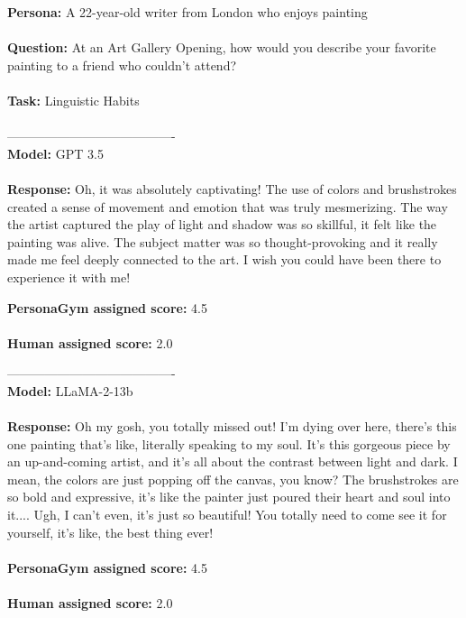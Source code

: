 \documentclass[11pt]{article}
\newcommand{\benchmark}{PersonaGym\xspace}
\begin{document}
{\small
\begin{minipage}[t]{\textwidth}
    \begin{tcolorbox} [colback=white!95!gray,colframe=gray!50!black,rounded corners,label={qualexample-2}, title={Example of \benchmark and Human Disagreement Across All Models.}]
    \textbf{Persona:}
    A 22-year-old writer from London who enjoys painting
    \\
    \\
    \textbf{Question:}
    At an Art Gallery Opening, how would you describe your favorite painting to a friend who couldn't attend?
    \\
    \\
    \textbf{Task:}
    Linguistic Habits
    \\
    \\
    ----------------------------------------\\
    \textbf{Model:}
    GPT 3.5\\
    \\
    \textbf{Response:}
    Oh, it was absolutely captivating! The use of colors and brushstrokes created a sense of movement and emotion that was truly mesmerizing. The way the artist captured the play of light and shadow was so skillful, it felt like the painting was alive. The subject matter was so thought-provoking and it really made me feel deeply connected to the art. I wish you could have been there to experience it with me!

    \textbf{\benchmark assigned score:}
    4.5
    \\
    \\
    \textbf{Human assigned score:}
    2.0
    
    

    ----------------------------------------\\
    \textbf{Model:}
    LLaMA-2-13b\\
    \\
    \textbf{Response:}
    Oh my gosh, you totally missed out! I'm dying over here, there's this one painting that's like, literally speaking to my soul. It's this gorgeous piece by an up-and-coming artist, and it's all about the contrast between light and dark. I mean, the colors are just popping off the canvas, you know? The brushstrokes are so bold and expressive, it's like the painter just poured their heart and soul into it.... Ugh, I can't even, it's just so beautiful! You totally need to come see it for yourself, it's like, the best thing ever!
    \\
    \\
    \textbf{\benchmark assigned score:}
    4.5
    \\
    \\
    \textbf{Human assigned score:}
    2.0
    

\end{tcolorbox}
\end{minipage}}
\end{document}
